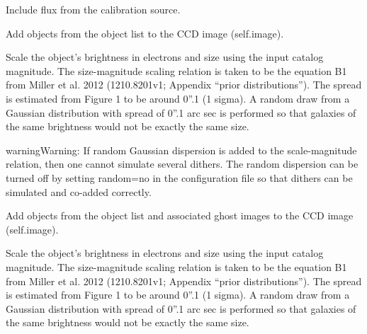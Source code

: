 \documentclass[a4paper,11pt,english]{sphinxmanual}
\begin{document}
\begin{fulllineitems}
\begin{fulllineitems}
\end{fulllineitems}


\begin{fulllineitems}
\label{simulator:simulator.simulator.VISsimulator.addLampFlux}
Include flux from the calibration source.

\end{fulllineitems}


\begin{fulllineitems}
\label{simulator:simulator.simulator.VISsimulator.addObjects}
Add objects from the object list to the CCD image (self.image).

Scale the object's brightness in electrons and size using the input catalog magnitude.
The size-magnitude scaling relation is taken to be the equation B1 from Miller et al. 2012 (1210.8201v1;
Appendix ``prior distributions''). The spread is estimated from Figure 1 to be around 0''.1 (1 sigma).
A random draw from a Gaussian distribution with spread of 0''.1 arc sec is performed so that galaxies
of the same brightness would not be exactly the same size.

\begin{notice}{warning}{Warning:}
If random Gaussian dispersion is added to the scale-magnitude relation, then one cannot
simulate several dithers. The random dispersion can be turned off by setting random=no in
the configuration file so that dithers can be simulated and co-added correctly.
\end{notice}

\end{fulllineitems}


\begin{fulllineitems}
\label{simulator:simulator.simulator.VISsimulator.addObjectsAndGhosts}
Add objects from the object list and associated ghost images to the CCD image (self.image).

Scale the object's brightness in electrons and size using the input catalog magnitude.
The size-magnitude scaling relation is taken to be the equation B1 from Miller et al. 2012 (1210.8201v1;
Appendix ``prior distributions''). The spread is estimated from Figure 1 to be around 0''.1 (1 sigma).
A random draw from a Gaussian distribution with spread of 0''.1 arc sec is performed so that galaxies
of the same brightness would not be exactly the same size.


\end{fulllineitems}
\end{fulllineitems}
\end{document}
